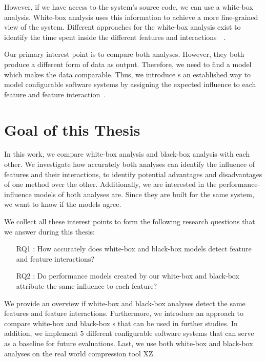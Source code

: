 However, if we have access to the system's source code, we can use a white-box analysis. 
White-box analysis uses this information to achieve a more fine-grained 
view of the system. 
Different approaches for the white-box analysis exist to identify the time spent inside the different features and interactions~\cite{Comprex}~\cite{ConfigCrusher}.

Our primary interest point is to compare both analyses. However, they both produce a different form of data as output. 
Therefore, we need to find a model which makes the data comparable. 
Thus, we introduce {\perfInfluenceModel}s an established way to model configurable software systems by assigning the expected influence to each feature 
and feature interaction~\cite{Performance-influence-models-for-highly-configurable-systems}. 

\section{Goal of this Thesis}
In this work, we compare white-box analysis and black-box analysis with each other. 
We investigate how accurately both analyses can identify the influence of features and their interactions,
to identify potential advantages and disadvantages of one method over the other. 
Additionally, we are interested in the performance-influence models of both analyses are. 
Since they are built for the same system, we want to know if the models agree.

We collect all these interest points to form the following research questions that we answer during this thesis: 

\begin{itemize}\label{researchQuestions}
    \item[RQ1]: How accurately does white-box and black-box models detect feature and feature interactions? 
    \item[RQ2]: Do performance models created by our white-box and black-box attribute the same influence to each feature?
\end{itemize}

We provide an overview if white-box and black-box analyses detect the same features and feature interactions.
Furthermore, we introduce an approach to compare white-box and black-box {\perfInfluenceModel}s that can be used in 
further studies. In addition, we implement 5 different configurable software systems that can serve as a baseline for future evaluations.
Last, we use both white-box and black-box analyses on the real world compression tool \textsc{XZ}.
